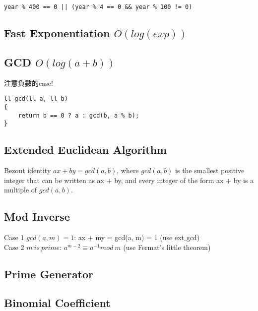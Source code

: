 \documentclass[10pt,oneside]{article}
\begin{document}
\begin{landscape}
\begin{multicols}{2}
\begin{lstlisting}
year % 400 == 0 || (year % 4 == 0 && year % 100 != 0)
\end{lstlisting}

\subsection{Fast Exponentiation $O(log(exp))$}



\subsection{GCD $O(log(a + b))$}

注意負數的case!

\begin{lstlisting}
ll gcd(ll a, ll b)
{
    return b == 0 ? a : gcd(b, a % b);
}
\end{lstlisting}

\subsection{Extended Euclidean Algorithm}

Bezout identity $ax + by = gcd(a, b)$, where $gcd(a, b)$ is the smallest positive integer that can be written as ax + by, and every integer of the form ax + by is a multiple of $gcd(a, b)$.



\subsection{Mod Inverse}

Case 1 $gcd(a, m) = 1$:  ax + my = gcd(a, m) = 1 (use ext$\_$gcd) \\

\noindent Case 2 $m\ is\ prime$: $a^{m - 2} \equiv a^{-1} mod\ m$ (use Fermat's little theorem)

\subsection{Prime Generator}


\subsection{Binomial Coefficient}


\end{multicols}
\end{landscape}
\end{document}
